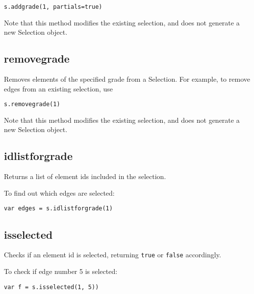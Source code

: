 \begin{lstlisting}
s.addgrade(1, partials=true)
\end{lstlisting}

Note that this method modifies the existing selection, and does not
generate a new Selection object.

\hypertarget{removegrade}{%
\subsection{removegrade}\label{removegrade}}

Removes elements of the specified grade from a Selection. For example,
to remove edges from an existing selection, use

\begin{lstlisting}
s.removegrade(1)
\end{lstlisting}

Note that this method modifies the existing selection, and does not
generate a new Selection object.

\hypertarget{idlistforgrade}{%
\subsection{idlistforgrade}\label{idlistforgrade}}

Returns a list of element ids included in the selection.

To find out which edges are selected:

\begin{lstlisting}
var edges = s.idlistforgrade(1)
\end{lstlisting}

\hypertarget{isselected}{%
\subsection{isselected}\label{isselected}}

Checks if an element id is selected, returning \texttt{true} or
\texttt{false} accordingly.

To check if edge number 5 is selected:

\begin{lstlisting}
var f = s.isselected(1, 5))
\end{lstlisting}
